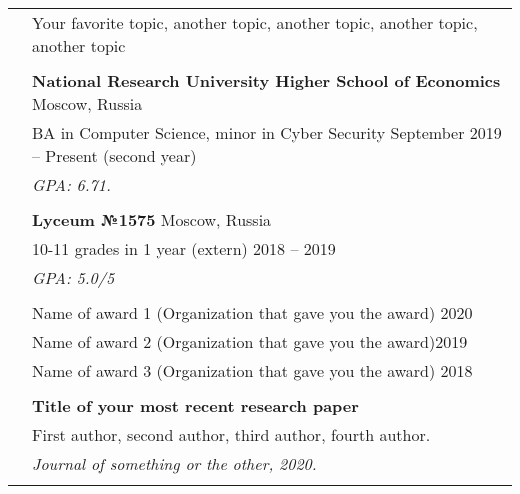 \documentclass[letterpaper, 11pt]{article}
\begin{document}
\begin{longtable}{p{1.3in}p{4.8in}}


\nohyphens{\color{OliveGreen}{Research interests}}
& Your favorite topic, another topic, another topic, another topic, another topic \\
& \\


\color{OliveGreen}{Education} 
& \textbf{National Research University Higher School of Economics} \hfill Moscow, Russia\\
& BA in Computer Science, minor in Cyber Security \hfill September 2019 -- Present (second year) \\
& {\it GPA: 6.71.}\\
& \\

& \textbf{Lyceum №1575} \hfill Moscow, Russia\\
& 10-11 grades in 1 year (extern) \hfill 2018 -- 2019 \\
& {\it GPA: 5.0/5}\\
& \\



{\color{OliveGreen}{Honors and}} 
& Name of award 1 (Organization that gave you the award) \hfill 2020\\
{\color{OliveGreen}{scholarships}} 
& Name of award 2 (Organization that gave you the award)\hfill 2019 \\
& Name of award 3 (Organization that gave you the award) \hfill 2018 \\
& \\

\nohyphens{\color{OliveGreen}{Publications}} 
& \textbf{Title of your most recent research paper} \\
& First author, second author, third author, fourth author. \\
& \textit{Journal of something or the other, 2020.}\\
& \\


\end{longtable}
\end{document}
